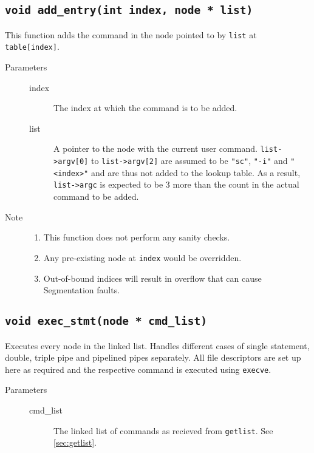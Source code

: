 \documentclass{article}
\begin{document}
\subsection{\lstinline{void add_entry(int index, node * list)}} \label{sec:addentry}
This function adds the command in the node pointed to by \lstinline{list} at \lstinline{table[index]}. 
\begin{description}
	\item[Parameters]\hfill
	\begin{description}
		\item[index] The index at which the command is to be added.
		\item[list] A pointer to the node with the current user command. \lstinline{list->argv[0]} to \lstinline{list->argv[2]} are assumed to be \lstinline{"sc"}, \lstinline{"-i"} and \lstinline{"<index>"} and are thus not added to the lookup table. As a result, \lstinline{list->argc} is expected to be 3 more than the count in the actual command to be added.
	\end{description}
	\item[Note]\hfill
		\begin{enumerate}
			\item This function does not perform any sanity checks. 
			\item Any pre-existing node at \lstinline{index} would be overridden. 
			\item Out-of-bound indices will result in overflow that can cause Segmentation faults.
		\end{enumerate}
\end{description}

\subsection{\lstinline{void exec_stmt(node * cmd_list)}} \label{sec:execstmt}
Executes every node in the linked list. Handles different cases of single statement, double, triple pipe and pipelined pipes separately. All file descriptors are set up here as required and the respective command is executed using \lstinline{execve}.
\begin{description}
	\item[Parameters]\hfill
	\begin{description}
		\item[cmd\_list] The linked list of commands as recieved from \lstinline{getlist}. See \ref{sec:getlist}.
	\end{description}
\end{description}
\end{document}
